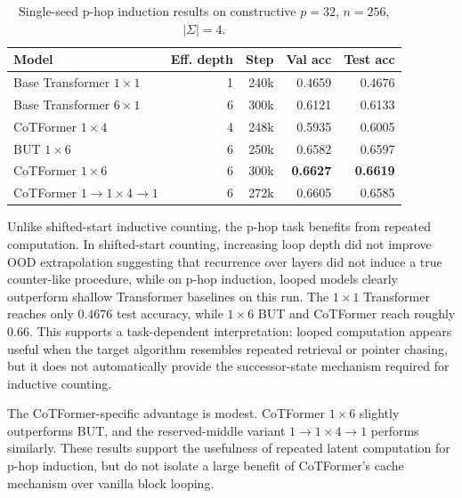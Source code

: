 \documentclass[10pt, letterpaper]{article} %
\begin{document}
\begin{table}[H]
\centering

\label{tab:phop_results}
{\small
\renewcommand{\arraystretch}{0.85}
\setlength{\tabcolsep}{4pt}
\begin{tabular}{lrrrr}
\toprule
Model & Eff. depth & Step & Val acc & Test acc \\
\midrule
Base Transformer \(1{\times}1\)        & 1 & 240k & 0.4659 & 0.4676 \\
Base Transformer \(6{\times}1\)        & 6 & 300k & 0.6121 & 0.6133 \\
CoTFormer \(1{\times}4\)               & 4 & 248k & 0.5935 & 0.6005 \\
BUT \(1{\times}6\)                     & 6 & 250k & 0.6582 & 0.6597 \\
CoTFormer \(1{\times}6\)               & 6 & 300k & \textbf{0.6627} & \textbf{0.6619} \\
CoTFormer \(1 \to 1{\times}4 \to 1\)   & 6 & 272k & 0.6605 & 0.6585 \\
\bottomrule
\end{tabular}
}
\caption{Single-seed p-hop induction results on constructive \(p=32\), \(n=256\), \(|\Sigma|=4\).}
\end{table}

Unlike shifted-start inductive counting, the p-hop task benefits from repeated computation. In shifted-start counting, increasing loop depth did not improve OOD extrapolation suggesting that recurrence over layers did not induce a true counter-like procedure, while on p-hop induction, looped models clearly outperform shallow Transformer baselines on this run. The \(1{\times}1\) Transformer reaches only \(0.4676\) test accuracy, while \(1{\times}6\) BUT and CoTFormer reach roughly \(0.66\). This supports a task-dependent interpretation: looped computation appears useful when the target algorithm resembles repeated retrieval or pointer chasing, but it does not automatically provide the successor-state mechanism required for inductive counting.

The CoTFormer-specific advantage is modest. CoTFormer \(1{\times}6\) slightly outperforms BUT, and the reserved-middle variant \(1 \to 1{\times}4 \to 1\) performs similarly. These results support the usefulness of repeated latent computation for p-hop induction, but do not isolate a large benefit of CoTFormer's cache mechanism over vanilla block looping. 
\end{document}
